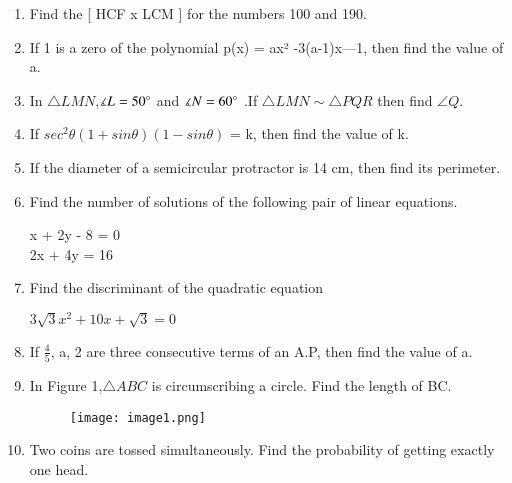 \documentclass[journal,12pt,twocolumn]{IEEEtran}
\begin{document}
\begin{enumerate}
\item Find the [ HCF  x LCM  ] for the numbers 100 and 190. \\
\item If 1 is a zero of the polynomial  p(x) = ax² -3(a-1)x—1, then find the value of a.\\
\item In $\triangle{LMN}$,$\measuredangle L=50\degree$ and $\measuredangle N=60\degree$ .If $\triangle LMN \sim \triangle PQR$ then find $\angle Q$.\\
\item If  $sec^2\theta(1 + sin\theta) (1 - sin\theta)$ = k,  then find the value of k. \\
\item If the diameter of a semicircular  protractor is 14 cm, then find its perimeter. \\
\item Find the number of solutions of the following pair of linear equations.
\begin{center}
    x + 2y - 8 = 0 \\
    2x + 4y = 16
\end{center}
\item  Find the discriminant of the quadratic equation
\begin{center}
     $3\sqrt{3}x^2+10x +\sqrt{3} = 0$ 
\end{center} 
\item If $\frac{4}{5}$, a, 2  are three consecutive terms of an A.P, then find the value of a.
\item  In Figure 1,$\triangle{ABC}$ is circumscribing a circle. Find the length of BC.
\begin{figure}[h!]
    \centering
    \texttt{[image: image1.png]}
 \end{figure}
\item Two coins are tossed simultaneously. Find the probability of getting exactly one head.
\bigskip

\end{enumerate}
\end{document}
